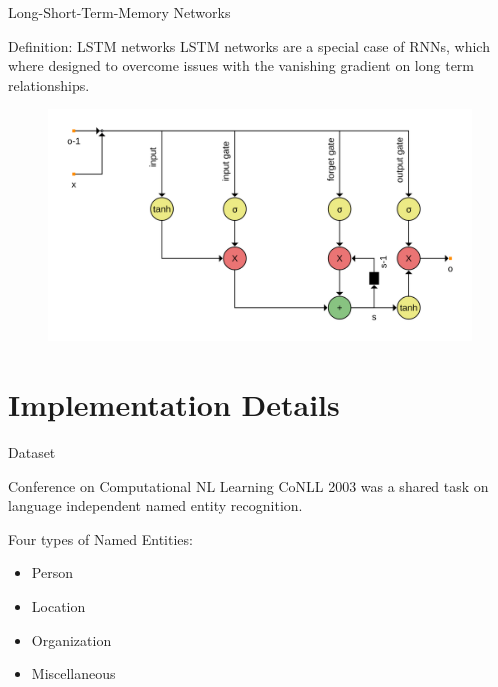 \documentclass[12pt, tikz]{beamer}
\begin{document}
\begin{frame}[fragile]{Long-Short-Term-Memory Networks}

	\begin{block}{Definition: LSTM networks}
		LSTM networks are a special case of RNNs, which where designed to overcome issues with the vanishing gradient on long term relationships.
	\end{block}
	\pause
	\vspace{-0.35cm}
	\begin{figure}
		\includegraphics[width=\linewidth]{img/lstm.png}
	\end{figure}
\end{frame}

\section{Implementation Details}

\begin{frame}[fragile]{Dataset}
	
	\begin{block}{Conference on Computational NL Learning}
		CoNLL 2003 was a shared task on language independent named entity recognition.
	\end{block}

	Four types of Named Entities:
	\begin{itemize}
		\item Person
		\item Location
		\item Organization
		\item Miscellaneous
	\end{itemize}

\end{frame}
\end{document}

